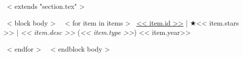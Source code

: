 ~< extends "section.tex" >~

~< block body >~
  ~< for item in items >~
    \href{<< item.repo_url >>}{<< item.id >>} | $\bigstar$<< item.stars >> |
    \emph{<< item.desc >>} \small{(\textit{<< item.type >>})} \hfill
    << item.year>> \par
  ~< endfor >~
~< endblock body >~
